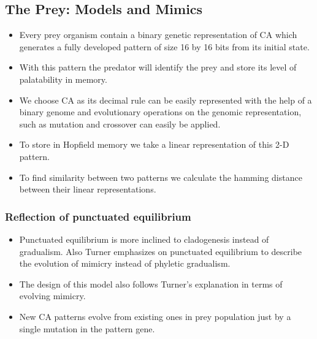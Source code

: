 \documentclass[a0,landscape]{a0poster}
\begin{document}
\begin{multicols}{5}
\color{DarkSlateGray}
\subsection*{The Prey: Models and Mimics}

\begin{itemize}
	\item Every prey organism contain a binary genetic representation of CA which generates a fully developed pattern of size 16 by 16 bits from its initial state.
	\item With this pattern the predator will identify the prey and store its level of palatability in memory. 
	\item We choose CA as its decimal rule can be easily represented with the help of a binary genome and evolutionary operations on the genomic representation, such as mutation and crossover can easily be applied. 
	\item To store in Hopfield memory we take a linear representation of this 2-D pattern.
	\item To find similarity between two patterns we calculate the hamming distance between their linear representations.
\end{itemize}

\color{SaddleBrown} 
\subsubsection*{Reflection of punctuated equilibrium}
\label{subsubsec:reflection-of-punctuated-equilibrium}

\begin{itemize}
	\item Punctuated equilibrium is more inclined to cladogenesis instead of gradualism. Also Turner \citep{turner1988} emphasizes on punctuated equilibrium to describe the evolution of mimicry instead of phyletic gradualism. 
	\item The design of this model also follows Turner's explanation in terms of evolving mimicry.
	\item New CA patterns evolve from existing ones in prey population just by a single mutation in the pattern gene. 
\end{itemize}


\end{multicols}
\end{document}
